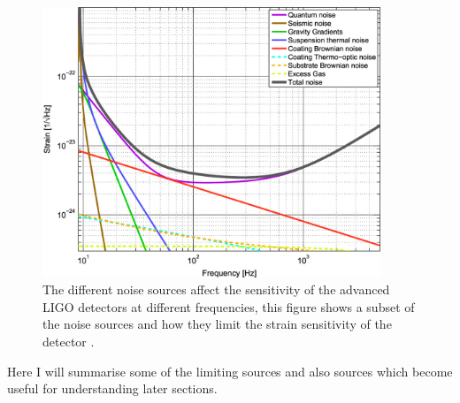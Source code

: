 \begin{figure}[h]
    \centering
    \includegraphics[width=0.9\textwidth]{C1_intro/noise_sensitivity.jpg}
    \caption[Example strain sensitivity curves for different noise sources in
\gls{LIGO}.]{The different noise sources affect the sensitivity of the
advanced \gls{LIGO} detectors at different frequencies, this figure shows a subset of the noise sources and how they limit the strain sensitivity of the detector \citep{aasi2015AdvancedLIGO}.}
\label{detectors:noisesensitivity} 
\end{figure}

Here I will summarise some of the limiting sources and also sources which
become useful for understanding later sections.

